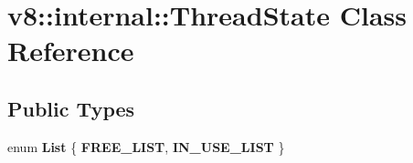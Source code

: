 \hypertarget{classv8_1_1internal_1_1ThreadState}{}\section{v8\+:\+:internal\+:\+:Thread\+State Class Reference}
\label{classv8_1_1internal_1_1ThreadState}
\subsection*{Public Types}
\begin{DoxyCompactItemize}
\item 
\mbox{\label{classv8_1_1internal_1_1ThreadState_a395f566f2cfacad9de5f830d10867f8e}} 
enum {\bfseries List} \{ {\bfseries F\+R\+E\+E\+\_\+\+L\+I\+ST}, 
{\bfseries I\+N\+\_\+\+U\+S\+E\+\_\+\+L\+I\+ST}
 \}
\end{DoxyCompactItemize}
